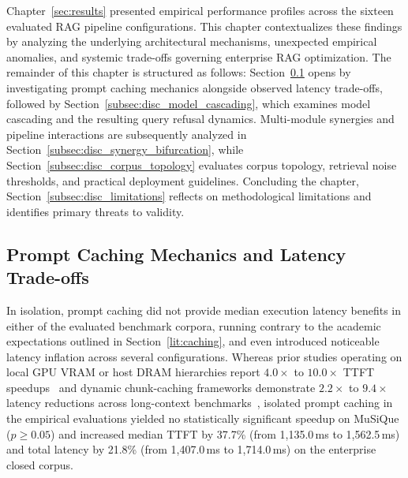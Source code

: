 Chapter~\ref{sec:results} presented empirical performance profiles across the sixteen evaluated RAG pipeline configurations. This chapter contextualizes these findings by analyzing the underlying architectural mechanisms, unexpected empirical anomalies, and systemic trade-offs governing enterprise RAG optimization. The remainder of this chapter is structured as follows: Section~\ref{subsec:disc_prompt_caching} opens by investigating prompt caching mechanics alongside observed latency trade-offs, followed by Section~\ref{subsec:disc_model_cascading}, which examines model cascading and the resulting query refusal dynamics. Multi-module synergies and pipeline interactions are subsequently analyzed in Section~\ref{subsec:disc_synergy_bifurcation}, while Section~\ref{subsec:disc_corpus_topology} evaluates corpus topology, retrieval noise thresholds, and practical deployment guidelines. Concluding the chapter, Section~\ref{subsec:disc_limitations} reflects on methodological limitations and identifies primary threats to validity.

\subsection{Prompt Caching Mechanics and Latency Trade-offs}
\label{subsec:disc_prompt_caching}

In isolation, prompt caching did not provide median execution latency benefits in either of the evaluated benchmark corpora, running contrary to the academic expectations outlined in Section~\ref{lit:caching}, and even introduced noticeable latency inflation across several configurations. Whereas prior studies operating on local GPU VRAM or host DRAM hierarchies report $4.0\times$ to $10.0\times$ TTFT speedups~\citep{gim2024promptcache, jin2025ragcache} and dynamic chunk-caching frameworks demonstrate $2.2\times$ to $9.4\times$ latency reductions across long-context benchmarks~\citep{lu2025turborag, yao2025cacheblend, wang2026fusionrag}, isolated prompt caching in the empirical evaluations yielded no statistically significant speedup on MuSiQue ($p \ge 0.05$) and increased median TTFT by 37.7\% (from 1,135.0\,ms to 1,562.5\,ms) and total latency by 21.8\% (from 1,407.0\,ms to 1,714.0\,ms) on the enterprise closed corpus.

